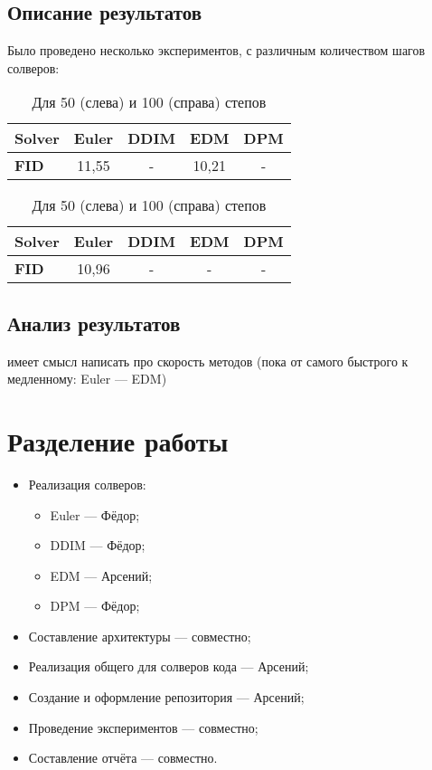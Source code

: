 \documentclass[a4paper]{article}
\begin{document}
    \subsection{Описание результатов}
    Было проведено несколько экспериментов, с различным количеством шагов солверов:
    \begin{table}
        \begin{tabular}{ l | c | c | c | c }
            \textbf{Solver} & Euler & DDIM  & EDM   & DPM \\ \hline
            \textbf{FID}    & 11{,}55     & -     & 10{,}21   & -
        \end{tabular}\hspace{50pt}%
        \begin{tabular}{ l | c | c | c | c }
            \textbf{Solver} & Euler & DDIM  & EDM   & DPM \\ \hline
            \textbf{FID}    & 10{,}96     & -     &   -   & -
        \end{tabular}
        \caption{Для 50 (слева) и 100 (справа) степов}
    \end{table}

    \subsection{Анализ результатов}
    
    имеет смысл написать про скорость методов (пока от самого быстрого к медленному:
    Euler --- EDM)


    \section{Разделение работы}
    \begin{itemize}
        \item Реализация солверов:
            \begin{itemize}
                \item Euler --- Фёдор;
                \item DDIM --- Фёдор;
                \item EDM --- Арсений;
                \item DPM --- Фёдор;
            \end{itemize}
        \item Составление архитектуры --- совместно;
        \item Реализация общего для солверов кода --- Арсений;
        \item Создание и оформление репозитория --- Арсений;
        \item Проведение экспериментов --- совместно;
        \item Составление отчёта --- совместно.
    \end{itemize}
\end{document}
